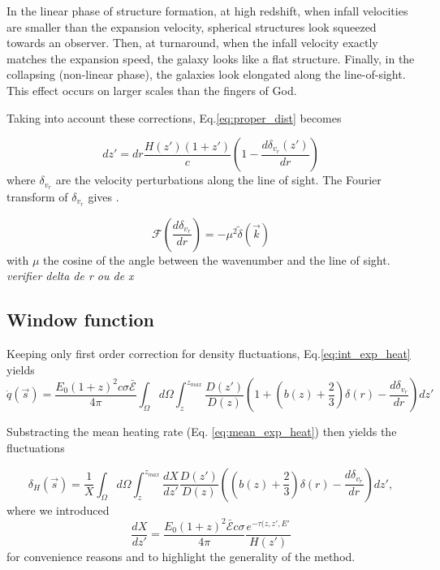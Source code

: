 \documentclass[twocolumns]{emulateapj}
\begin{document}
 In the linear phase of structure formation, at high redshift, when infall velocities are smaller than the expansion velocity, spherical structures look squeezed towards an observer. Then, at  turnaround, when the infall velocity exactly matches the expansion speed, the galaxy looks like a flat structure. Finally, in the collapsing (non-linear phase), the galaxies look elongated along the line-of-sight. This effect occurs on larger scales than the fingers of God.

Taking into account these corrections,  Eq.\ref{eq:proper_dist} becomes

  \begin{equation}
    \label{eq:vel_perturb}
    dz'=dr\frac{H(z')(1+z')}{c}\left(1-\frac{d\delta_{v_r}(z')}{dr}\right)
  \end{equation}
where $\delta_{v_r}$ are the velocity perturbations along the line of sight.
The Fourier transform of $\delta_{v_r}$ gives  \citep{1987MNRAS.227....1K}.

\begin{equation}
  \label{eq:kaiser2}
  \mathcal{F}\left(\frac{d\delta_{v_r}}{dr}\right)=-\mu^2\tilde{\delta}(\vec{k})
\end{equation}
with $\mu$ the cosine of the angle between the wavenumber and the line of sight.
\textit{verifier delta de r ou de x}

\subsection{Window function }
Keeping only first order correction for density fluctuations, Eq.\ref{eq:int_exp_heat} yields
\begin{equation}
  \label{eq:mean_heat0}
  \dot{q}(\vec{s})=\frac{E_0(1+z)^2c\sigma\mathcal{\bar{E}}}{4\pi}\int_{\Omega}d\Omega\int_z^{z_{max}}\frac{D(z')}{D(z)}\left(1+(b(z)+\frac{2}{3}) \delta(r) -\frac{d\delta_{v_r}}{dr}\right) dz'
\end{equation}

Substracting the mean heating rate (Eq. \ref{eq:mean_exp_heat}) then yields the fluctuations

\begin{equation}
  \label{eq:heat_fluc0}
  \delta_H(\vec{s})=\frac{1}{X}\int_{\Omega}d\Omega\int_z^{z_{max}}\frac{dX}{dz'}\frac{D(z')}{D(z)}\left((b(z)+\frac{2}{3}) \delta(r) -\frac{d\delta_{v_r}}{dr}\right)   dz',
\end{equation}
where we introduced
\begin{equation}
  \label{eq:def_X}
  \frac{dX}{dz'}=\frac{E_0(1+z)^2\mathcal{\bar{E}}c\sigma}{4\pi}\frac{e^{-\tau(z,z',E'}}{H(z')}
\end{equation}
for convenience reasons and to highlight the generality of the method.
\end{document}
